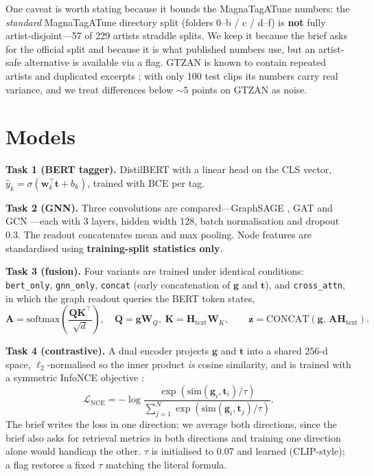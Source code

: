 \documentclass{article}
\begin{document}
One caveat is worth stating because it bounds the MagnaTagATune numbers: the
\emph{standard} MagnaTagATune directory split (folders 0--b / c / d--f) is
\textbf{not} fully artist-disjoint---57 of 229 artists straddle splits. We keep it
because the brief asks for the official split and because it is what published
numbers use, but an artist-safe alternative is available via a flag. GTZAN is known
to contain repeated artists and duplicated excerpts \citep{sturm2013gtzan}; with
only 100 test clips its numbers carry real variance, and we treat differences
below $\sim\!5$ points on GTZAN as noise.

\section{Models}

\textbf{Task 1 (BERT tagger).} DistilBERT \citep{sanh2019distilbert} with a linear
head on the CLS vector, $\hat{y}_k = \sigma(\mathbf{w}_k^\top \mathbf{t} + b_k)$,
trained with BCE per tag.

\textbf{Task 2 (GNN).} Three convolutions are compared---GraphSAGE
\citep{hamilton2017graphsage}, GAT \citep{velickovic2018gat} and GCN
\citep{kipf2017gcn}---each with 3 layers, hidden width 128, batch normalisation and
dropout $0.3$. The readout concatenates mean and max pooling. Node features are
standardised using \textbf{training-split statistics only}.

\textbf{Task 3 (fusion).} Four variants are trained under identical conditions:
\texttt{bert\_only}, \texttt{gnn\_only}, \texttt{concat} (early concatenation of
$\mathbf{g}$ and $\mathbf{t}$), and \texttt{cross\_attn}, in which the graph
readout queries the BERT token states,
\begin{equation}
\mathbf{A} = \mathrm{softmax}\!\left(\frac{\mathbf{Q}\mathbf{K}^\top}{\sqrt{d}}\right),\quad
\mathbf{Q} = \mathbf{g}\mathbf{W}_Q,\ \mathbf{K} = \mathbf{H}_{\text{text}}\mathbf{W}_K,
\qquad
\mathbf{z} = \mathrm{CONCAT}(\mathbf{g},\, \mathbf{A}\mathbf{H}_{\text{text}}).
\end{equation}

\textbf{Task 4 (contrastive).} A dual encoder projects $\mathbf{g}$ and
$\mathbf{t}$ into a shared $256$-d space, $\ell_2$-normalised so the inner product
\emph{is} cosine similarity, and is trained with a symmetric InfoNCE objective
\citep{oord2018cpc,radford2021clip}:
\begin{equation}
\mathcal{L}_{\text{NCE}} = -\log \frac{\exp(\mathrm{sim}(\mathbf{g}_i,\mathbf{t}_i)/\tau)}
{\sum_{j=1}^{N}\exp(\mathrm{sim}(\mathbf{g}_i,\mathbf{t}_j)/\tau)} .
\end{equation}
The brief writes the loss in one direction; we average both directions, since the
brief also asks for retrieval metrics in both directions and training one
direction alone would handicap the other. $\tau$ is initialised to $0.07$ and
learned (CLIP-style); a flag restores a fixed $\tau$ matching the literal formula.
\end{document}
